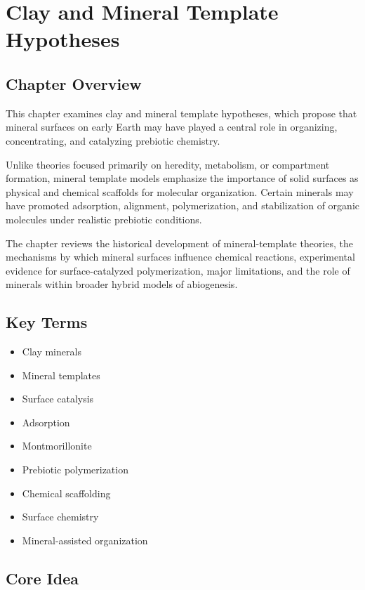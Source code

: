 \documentclass[
  oneside]{book}
\providecommand{\tightlist}{%
  \setlength{\itemsep}{0pt}\setlength{\parskip}{0pt}}
\begin{document}
\chapter{Clay and Mineral Template Hypotheses}\label{clay-and-mineral-template-hypotheses}

\section{Chapter Overview}\label{chapter-overview-5}

This chapter examines clay and mineral template hypotheses, which propose that mineral surfaces on early Earth may have played a central role in organizing, concentrating, and catalyzing prebiotic chemistry.

Unlike theories focused primarily on heredity, metabolism, or compartment formation, mineral template models emphasize the importance of solid surfaces as physical and chemical scaffolds for molecular organization. Certain minerals may have promoted adsorption, alignment, polymerization, and stabilization of organic molecules under realistic prebiotic conditions.

The chapter reviews the historical development of mineral-template theories, the mechanisms by which mineral surfaces influence chemical reactions, experimental evidence for surface-catalyzed polymerization, major limitations, and the role of minerals within broader hybrid models of abiogenesis.

\section{Key Terms}\label{key-terms-5}

\begin{itemize}
\tightlist
\item
  Clay minerals
\item
  Mineral templates
\item
  Surface catalysis
\item
  Adsorption
\item
  Montmorillonite
\item
  Prebiotic polymerization
\item
  Chemical scaffolding
\item
  Surface chemistry
\item
  Mineral-assisted organization
\end{itemize}

\section{Core Idea}\label{core-idea-5}
\end{document}
